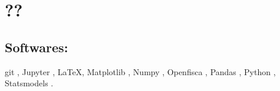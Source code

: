 
\ifx\isEmbedded\undefined


\setcounter{chapter}{3}
\chapter{\label{??} ??}
\else \fi

\section{Softwares:}

git \citep{hamano2005git},  Jupyter \citep{kluyver2016jupyter}, \LaTeX \citep{lamport1994latex},  Matplotlib \citep{hunter2007matplotlib}, Numpy \citep{van2011numpy} , Openfisca \citep{openfisca},  Pandas \citep{mckinney2011pandas}, Python \citep{Rossum1995}, Statsmodels \citep{seabold2010statsmodels}.





\ifx\isEmbedded\undefined
\newpage
%

\else \fi